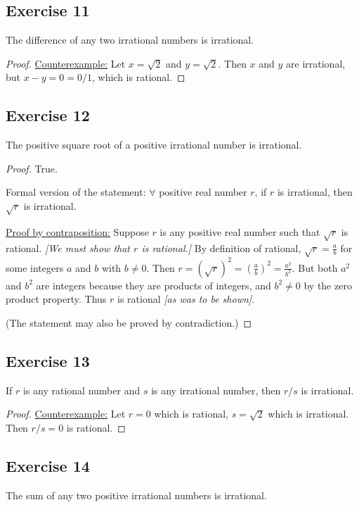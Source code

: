 \documentclass[14pt]{extarticle}
\newcommand{\fa}{\forall}
\begin{document}
\subsection{Exercise 11}
The difference of any two irrational numbers is irrational.

\begin{proof}
\underline{Counterexample:} Let $x = \sqrt{2}$ and $y = \sqrt{2}$. Then $x$ and $y$ are irrational, but $x - y = 0  = 0/1$, which is rational.
\end{proof}

\subsection{Exercise 12}
The positive square root of a positive irrational number is irrational.

\begin{proof}
True.

Formal version of the statement: $\fa$ positive real number
$r$, if $r$ is irrational, then $\sqrt{r}$ is irrational.

\underline{Proof by contraposition:} Suppose $r$ is any positive real number such that $\sqrt{r}$ is rational. {\it [We must show that $r$ is rational.]} By definition of rational, $\sqrt{r} = \frac{a}{b}$ for some integers $a$ and $b$ with $b \neq 0$. Then $r = (\sqrt{r})^2 = \left(\frac{a}{b}\right)^2 = \frac{a^2}{b^2}$. But both $a^2$ and $b^2$ are integers because they are products of integers, and $b^2 \neq 0$ by the zero product property. Thus $r$ is rational {\it [as was to be shown]}. 

(The statement may also be proved by contradiction.)
\end{proof}

\subsection{Exercise 13}
If \(r\) is any rational number and $s$ is any irrational number, then $r/s$ is irrational.

\begin{proof}
\underline{Counterexample:} Let $r = 0$ which is rational, $s = \sqrt{2}$ which is irrational. Then $r / s = 0$ is rational.
\end{proof}

\subsection{Exercise 14}
The sum of any two positive irrational numbers is irrational.
\end{document}
